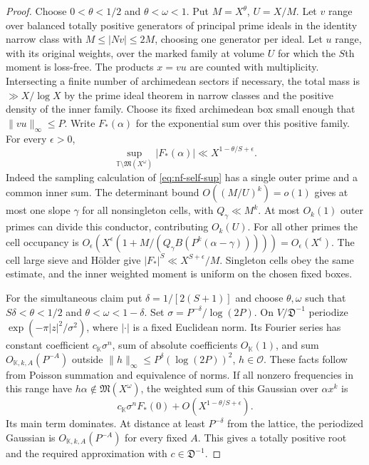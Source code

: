 \documentclass[11pt,letterpaper]{article}
\theoremstyle{definition}
\numberwithin{equation}{section}
\begin{document}
\begin{proof}
Choose $0<\theta<1/2$ and $\theta<\omega<1$. Put
$M=X^\theta$, $U=X/M$. Let $v$ range over balanced totally
positive generators of principal prime ideals in the identity
narrow class with $M\le|Nv|\le2M$, choosing one generator per
ideal. Let $u$ range, with its original weights, over the marked
family at volume $U$ for which the $S$th moment is loss-free. The
products $x=vu$ are counted with multiplicity. Intersecting a
finite number of archimedean sectors if necessary, the total mass is
$\gg X/\log X$ by the prime ideal theorem in narrow classes and the
positive density of the inner family. Choose its fixed archimedean box
small enough that $\|vu\|_\infty\le P$. Write $F_*(\alpha)$ for
the exponential sum over this positive family. For every $\epsilon>0$,
\[
 \sup_{\mathbb T\setminus\mathfrak M(X^\omega)}
          |F_*(\alpha)|\ll X^{1-\theta/S+\epsilon}.
\]
Indeed the sampling calculation of \eqref{eq:nf-self-sup} has
a single outer prime and a common inner sum. The determinant
bound $O((M/U)^k)=o(1)$ gives at most one slope $\gamma$ for
all nonsingleton cells, with $Q_\gamma\ll M^k$. At most $O_k(1)$
outer primes can divide this conductor, contributing $O_k(U)$.
For all other primes the cell occupancy is
$O_\epsilon(X^\epsilon(1+M/(Q_\gamma
B(P^k(\alpha-\gamma)))))=O_\epsilon(X^\epsilon)$.
The cell large sieve and H\"older give
$|F_*|^S\ll X^{S+\epsilon}/M$. Singleton cells obey the same
estimate, and the inner weighted moment is uniform on the chosen
fixed boxes.

For the simultaneous claim put $\delta=1/[2(S+1)]$ and choose
$\theta,\omega$ such that $S\delta<\theta<1/2$ and
$\theta<\omega<1-\delta$. Set $\sigma=P^{-\delta}/\log(2P)$.
On $V/\mathfrak D^{-1}$ periodize $\exp(-\pi|z|^2/\sigma^2)$,
where $|\cdot|$ is a fixed Euclidean norm. Its Fourier series
has constant coefficient $c_{\mathbb K}\sigma^n$, sum of absolute
coefficients $O_{\mathbb K}(1)$, and sum $O_{\mathbb K,k,A}(P^{-A})$
outside $\|h\|_\infty\le P^{\delta}(\log(2P))^2$, $h\in\mathcal O$.
These facts follow from Poisson summation and equivalence of norms.
If all nonzero frequencies in this range have
$h\alpha\notin\mathfrak M(X^{\omega})$, the weighted sum of this
Gaussian over $\alpha x^k$ is
\[
 c_{\mathbb K}\sigma^n F_*(0)+O(X^{1-\theta/S+\epsilon}).
\]
Its main term dominates. At distance at least $P^{-\delta}$ from
the lattice, the periodized Gaussian is $O_{\mathbb K,k,A}(P^{-A})$
for every fixed $A$. This gives a totally positive root and the
required approximation with $c\in\mathfrak D^{-1}$.


\end{proof}
\end{document}
